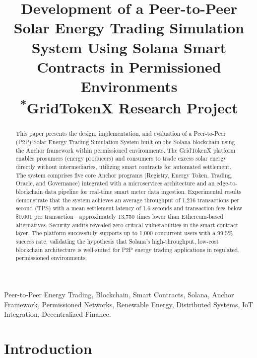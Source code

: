 \documentclass[conference]{IEEEtran}
\begin{document}
\title{Development of a Peer-to-Peer Solar Energy Trading Simulation System Using Solana Smart Contracts in Permissioned Environments\\
{\footnotesize \textsuperscript{*}GridTokenX Research Project}}

\author{
}

\maketitle

\begin{abstract}
This paper presents the design, implementation, and evaluation of a Peer-to-Peer (P2P) Solar Energy Trading Simulation System built on the Solana blockchain using the Anchor framework within permissioned environments. The GridTokenX platform enables prosumers (energy producers) and consumers to trade excess solar energy directly without intermediaries, utilizing smart contracts for automated settlement. The system comprises five core Anchor programs (Registry, Energy Token, Trading, Oracle, and Governance) integrated with a microservices architecture and an edge-to-blockchain data pipeline for real-time smart meter data ingestion. Experimental results demonstrate that the system achieves an average throughput of 1,216 transactions per second (TPS) with a mean settlement latency of 1.6 seconds and transaction fees below \$0.001 per transaction---approximately 13,750 times lower than Ethereum-based alternatives. Security audits revealed zero critical vulnerabilities in the smart contract layer. The platform successfully supports up to 1,000 concurrent users with a 99.5\% success rate, validating the hypothesis that Solana's high-throughput, low-cost blockchain architecture is well-suited for P2P energy trading applications in regulated, permissioned environments.
\end{abstract}

\begin{IEEEkeywords}
Peer-to-Peer Energy Trading, Blockchain, Smart Contracts, Solana, Anchor Framework, Permissioned Networks, Renewable Energy, Distributed Systems, IoT Integration, Decentralized Finance.
\end{IEEEkeywords}

\section{Introduction}
\end{document}
